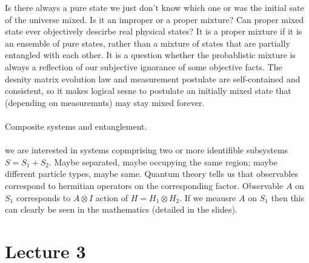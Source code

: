 \documentclass{article}
\begin{document}
Is there always a pure state we just don't know which one or was the initial sate of the universe mixed. Is it an improper or a proper mixture? Can proper mixed state ever objectively descirbe real physical states? It is a proper mixture if it is an ensemble of pure states, rather than a mixture of states that are partially entangled with each other. It is a question whether the probablistic mixture is always a reflection of our subjective ignorance of some objective facts. The desnity matrix evolution law and measurement postulate are self-contained and consistent, so it makes logical sesne to postulate an initially mixed state that (depending on measuremnts) may stay mixed forever. \\\\
Composite systems and entanglement. \\\\
we are interested in systems copmprising two or more identifible subsystems $S= S_1 + S_2$. Maybe separated, maybe occupying the same region; maybe different particle types, maybe same. Quantum theory tells us that observables correspond to hermitian operators on the corresponding factor. Observable $A$ on $S_1$ corresponds to $A \otimes I$ action of $H = H_1 \otimes H_2$. If we meausre $A$ on $S_1$ then this can clearly be seen in the mathematics (detailed in the slides). 
\section{Lecture 3}
\end{document}
